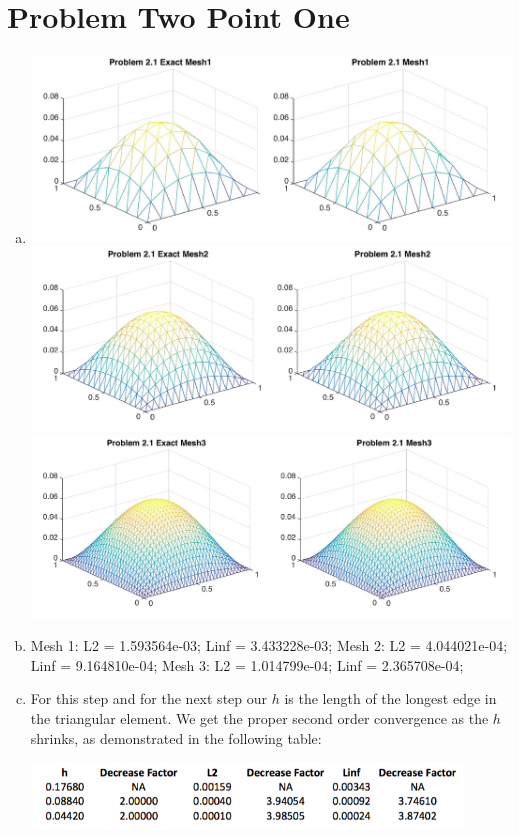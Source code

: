 \documentclass[11pt]{article}
\begin{document}
\section*{Problem Two Point One}
\begin{enumerate}[(a)]
\item

\includegraphics[width=\textwidth]{211.jpg}
\includegraphics[width=\textwidth]{212.jpg}
\includegraphics[width=\textwidth]{213.jpg}
\item
Mesh 1: L2 = 1.593564e-03; Linf = 3.433228e-03;
Mesh 2: L2 = 4.044021e-04; Linf = 9.164810e-04;
Mesh 3: L2 = 1.014799e-04; Linf = 2.365708e-04;

\item 
For this step and for the next step our $h$ is the length of the longest edge in the triangular  element. We get the proper second order convergence as the $h$ shrinks, as demonstrated in the following table:

\begin{center}
\includegraphics[width=0.9\textwidth]{21b.png}
\end{center}


\end{enumerate}
\end{document}
